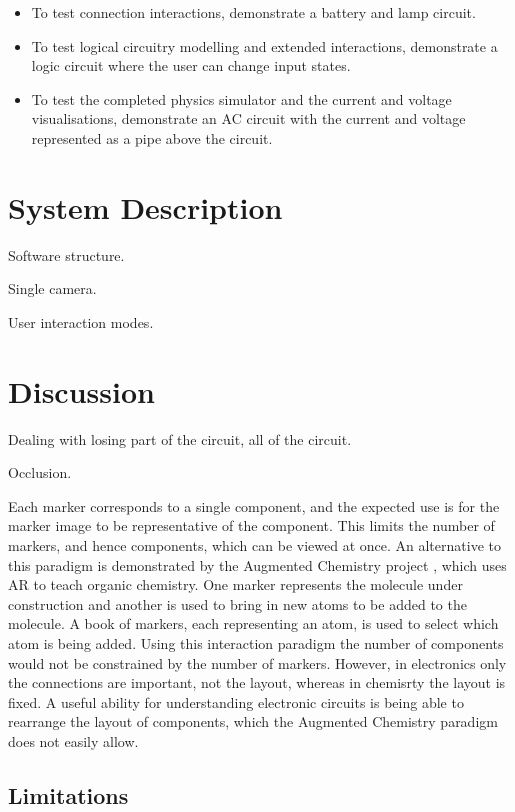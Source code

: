 \begin{itemize}
\item To test connection interactions, demonstrate a battery and lamp circuit.
\item To test logical circuitry modelling and extended interactions, demonstrate a logic circuit where the user can change input states.
\item To test the completed physics simulator and the current and voltage visualisations, demonstrate an AC circuit with the current and voltage represented as a pipe above the circuit.
\end{itemize}

\section{System Description}
Software structure.

Single camera.

User interaction modes.

\section{Discussion}

Dealing with losing part of the circuit, all of the circuit.

Occlusion.

Each marker corresponds to a single component, and the expected use is for the marker image to be representative of the component. This limits the number of markers, and hence components, which can be viewed at once. An alternative to this paradigm is demonstrated by the Augmented Chemistry project \cite{fjeld07}, which uses AR to teach organic chemistry. One marker represents the molecule under construction and another is used to bring in new atoms to be added to the molecule. A book of markers, each representing an atom, is used to select which atom is being added. Using this interaction paradigm the number of components would not be constrained by the number of markers. However, in electronics only the connections are important, not the layout, whereas in chemisrty the layout is fixed. A useful ability for understanding electronic circuits is being able to rearrange the layout of components, which the Augmented Chemistry paradigm does not easily allow.


\subsection{Limitations}

